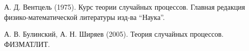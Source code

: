 \documentclass[12pt,a4paper]{article}
\begin{document}
\newpage
\nocite{*}


\begin{thebibliography}{9}
%

 А. Д. Вентцель (1975).
\newblock Курс теории случайных процессов. 
\newblock Главная редакция физико-математической литературы изд-ва ``Наука''.

 А. В. Булинский, А. Н. Ширяев (2005).
\newblock Теория случайных процессов. 
\newblock ФИЗМАТЛИТ.

\end{thebibliography}
\end{document}

